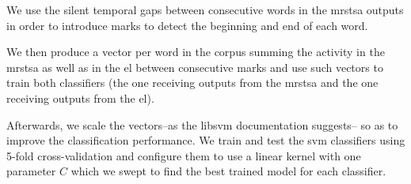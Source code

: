 \documentclass[10pt,letterpaper]{article}
\newcommand{\CC}{C\nolinebreak\hspace{-.05em}\raisebox{.4ex}{\tiny\bf +}\nolinebreak\hspace{-.10em}\raisebox{.4ex}{\tiny\bf +}}
\begin{document}
We use the silent temporal gaps between consecutive words in the \gls{mrstsa} outputs in order to introduce marks to
detect the beginning and end of each word.

We then produce a vector per word in the corpus summing the activity in the \gls{mrstsa} as well as in the \gls{el} between consecutive marks
and use such vectors to train both classifiers (the one receiving outputs from the \gls{mrstsa} and the one receiving outputs from the \gls{el}).

Afterwards, we scale the vectors--as the \gls{libsvm} documentation suggests--
so as to improve the classification performance.
We train and test the \gls{svm} classifiers using 5-fold cross-validation
and configure them to use a linear kernel with one parameter $C$ which
we swept to find the best trained model for each classifier.













\end{document}

